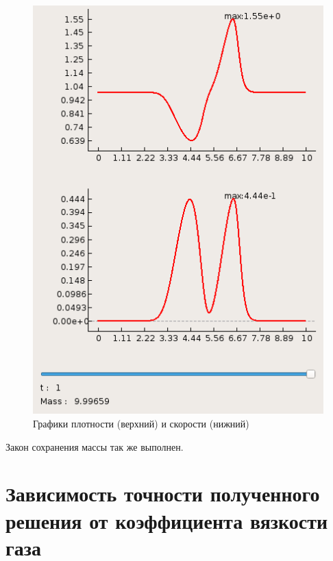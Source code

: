\documentclass[a4paper, 11pt]{article}
\begin{document}
\begin{figure}[H]
\begin{minipage}[h] {0.49\linewidth}
		\includegraphics[width=1\linewidth]{p2/p2_t=1.png}
	\end{minipage}
	\caption{Графики плотности (верхний) и скорости (нижний)}
\end{figure}
Закон сохранения массы так же выполнен.

\section{Зависимость точности полученного решения от коэффициента вязкости газа}
\end{document}
